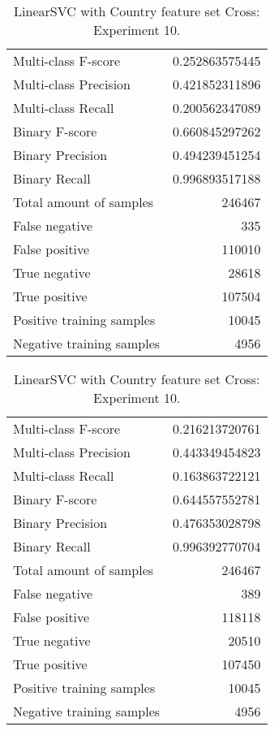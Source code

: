 \begin{table}[H]
\begin{minipage}{0.5\textwidth}
\caption{LinearSVC with Country feature set Cross: Experiment 9.}
\centering
\begin{tabular}{l r}
\toprule
Multi-class F-score & 0.252863575445 \\
Multi-class Precision & 0.421852311896 \\
Multi-class Recall & 0.200562347089 \\
\midrule
Binary F-score & 0.660845297262 \\
Binary Precision & 0.494239451254 \\
Binary Recall & 0.996893517188 \\
\midrule
Total amount of samples & 246467 \\
False negative & 335 \\
False positive & 110010 \\
True negative & 28618 \\
True positive & 107504 \\
\midrule
Positive training samples & 10045 \\
Negative training samples & 4956 \\
\bottomrule
\end{tabular}
\end{minipage}
\hfillx
\begin{minipage}{0.5\textwidth}
\caption{LinearSVC with Country feature set Cross: Experiment 10.}
\centering
\begin{tabular}{l r}
\toprule
Multi-class F-score & 0.216213720761 \\
Multi-class Precision & 0.443349454823 \\
Multi-class Recall & 0.163863722121 \\
\midrule
Binary F-score & 0.644557552781 \\
Binary Precision & 0.476353028798 \\
Binary Recall & 0.996392770704 \\
\midrule
Total amount of samples & 246467 \\
False negative & 389 \\
False positive & 118118 \\
True negative & 20510 \\
True positive & 107450 \\
\midrule
Positive training samples & 10045 \\
Negative training samples & 4956 \\
\bottomrule
\end{tabular}
\end{minipage}
\end{table}
